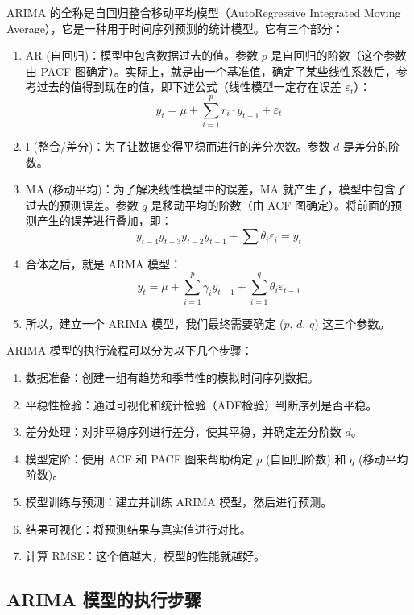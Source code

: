\begin{definition}[ARIMA 模型]
    ARIMA 的全称是自回归整合移动平均模型（AutoRegressive Integrated Moving Average），它是一种用于时间序列预测的统计模型。它有三个部分：
    \begin{enumerate}
        \item AR (自回归)：模型中包含数据过去的值。参数 $p$ 是自回归的阶数（这个参数由 PACF 图确定）。实际上，就是由一个基准值，确定了某些线性系数后，参考过去的值得到现在的值，即下述公式（线性模型一定存在误差 $\varepsilon_t$）：
              $$y_t=\mu+\sum_{i=1}^p r_i \cdot y_{t-1}+\varepsilon_t$$
        \item I (整合/差分)：为了让数据变得平稳而进行的差分次数。参数 $d$ 是差分的阶数。
        \item MA (移动平均)：为了解决线性模型中的误差，MA 就产生了，模型中包含了过去的预测误差。参数 $q$ 是移动平均的阶数（由 ACF 图确定）。将前面的预测产生的误差进行叠加，即：
              $$y_{t-4} y_{t-3} y_{t-2} y_{t-1} + \sum \theta_i \varepsilon_i = {y_t}$$
        \item 合体之后，就是 ARMA 模型：
              $$y_t=\mu+\sum_{i=1}^p \gamma_i y_{t-1}+\sum_{i=1}^q \theta_i \varepsilon_{t-1}$$
        \item 所以，建立一个 ARIMA 模型，我们最终需要确定 ($p$, $d$, $q$) 这三个参数。
    \end{enumerate}
\end{definition}

ARIMA 模型的执行流程可以分为以下几个步骤：

\begin{enumerate}
    \item 数据准备：创建一组有趋势和季节性的模拟时间序列数据。
    \item 平稳性检验：通过可视化和统计检验（ADF检验）判断序列是否平稳。
    \item 差分处理：对非平稳序列进行差分，使其平稳，并确定差分阶数 $d$。
    \item 模型定阶：使用 ACF 和 PACF 图来帮助确定 $p$ (自回归阶数) 和 $q$ (移动平均阶数)。
    \item 模型训练与预测：建立并训练 ARIMA 模型，然后进行预测。
    \item 结果可视化：将预测结果与真实值进行对比。
    \item 计算 RMSE：这个值越大，模型的性能就越好。
\end{enumerate}

\subsection{ARIMA 模型的执行步骤}

